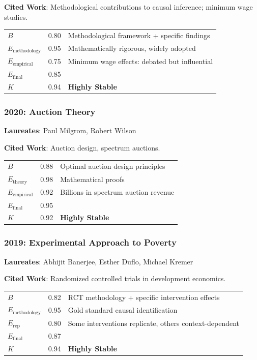 \documentclass[11pt,a4paper]{article}
\begin{document}
\textbf{Cited Work}: Methodological contributions to causal inference; minimum wage studies.

\begin{center}
\begin{tabular}{lcl}
\toprule
$B$ & 0.80 & Methodological framework + specific findings \\
$E_{\text{methodology}}$ & 0.95 & Mathematically rigorous, widely adopted \\
$E_{\text{empirical}}$ & 0.75 & Minimum wage effects: debated but influential \\
\midrule
$E_{\text{final}}$ & 0.85 & \\
$K$ & 0.94 & \textbf{Highly Stable} \\
\bottomrule
\end{tabular}
\end{center}

\subsubsection{2020: Auction Theory}
\textbf{Laureates}: Paul Milgrom, Robert Wilson

\textbf{Cited Work}: Auction design, spectrum auctions.

\begin{center}
\begin{tabular}{lcl}
\toprule
$B$ & 0.88 & Optimal auction design principles \\
$E_{\text{theory}}$ & 0.98 & Mathematical proofs \\
$E_{\text{empirical}}$ & 0.92 & Billions in spectrum auction revenue \\
\midrule
$E_{\text{final}}$ & 0.95 & \\
$K$ & 0.92 & \textbf{Highly Stable} \\
\bottomrule
\end{tabular}
\end{center}

\subsubsection{2019: Experimental Approach to Poverty}
\textbf{Laureates}: Abhijit Banerjee, Esther Duflo, Michael Kremer

\textbf{Cited Work}: Randomized controlled trials in development economics.

\begin{center}
\begin{tabular}{lcl}
\toprule
$B$ & 0.82 & RCT methodology + specific intervention effects \\
$E_{\text{methodology}}$ & 0.95 & Gold standard causal identification \\
$E_{\text{rep}}$ & 0.80 & Some interventions replicate, others context-dependent \\
\midrule
$E_{\text{final}}$ & 0.87 & \\
$K$ & 0.94 & \textbf{Highly Stable} \\
\bottomrule
\end{tabular}
\end{center}
\end{document}
